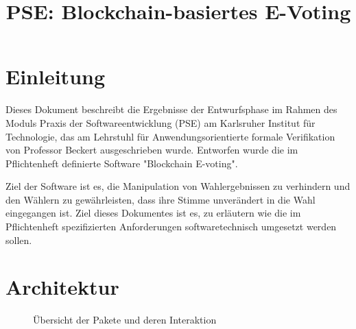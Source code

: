 \documentclass[parskip=full]{scrartcl}
\title{PSE: Blockchain-basiertes E-Voting}
\begin{document}
	\clearpage
	\maketitle
	\newpage
	
	\tableofcontents
	\newpage
	\section{Einleitung}
	Dieses Dokument beschreibt die Ergebnisse der Entwurfsphase im Rahmen des Moduls Praxis der Softwareentwicklung (PSE) am Karlsruher Institut für Technologie, das am Lehrstuhl für Anwendungsorientierte formale Verifikation von Professor Beckert ausgeschrieben wurde.
	Entworfen wurde die im Pflichtenheft definierte Software "Blockchain E-voting". 
	
	Ziel der Software ist es, die Manipulation
	von Wahlergebnissen zu verhindern und den Wählern zu gewährleisten, dass ihre Stimme unverändert in die Wahl eingegangen ist.
	Ziel dieses Dokumentes ist es, zu erläutern wie die im Pflichtenheft spezifizierten Anforderungen softwaretechnisch umgesetzt werden sollen.
	
		\section{Architektur}
	\begin{figure}[!h]
	\centering
	
	\caption{Übersicht der Pakete und deren Interaktion}
	\end{figure}
\end{document}
